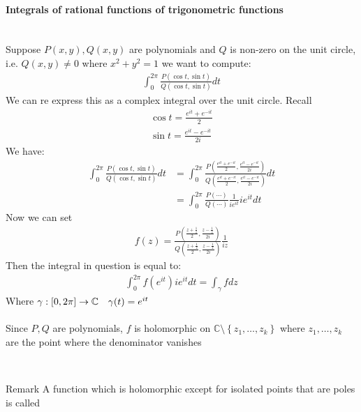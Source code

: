 \paragraph{Integrals of rational functions of trigonometric functions}%
	\label{par:Integrals of rational function of trigonometric functions}$ $\\

	
    
	Suppose $P\left(x, y\right), Q\left(x, y\right)$ are polynomials and $Q$ is non-zero on the unit circle, i.e. $Q\left(x, y\right) \neq 0$ where $x^2 + y^2 = 1$ we want to compute:
	\begin{align*} 
		\int_{0}^{2\pi}\frac{P\left(\cos t, \sin t\right)}{Q\left(\cos t, \sin t\right)}dt
	\end{align*}
	We can re express this as a complex integral over the unit circle. Recall
	\begin{align*} 
		\cos t =  \frac{e^{it} + e^{-it}}{2}\\
		\sin t =  \frac{e^{it} - e^{-it}}{2i}
	\end{align*}
	We have:
	\begin{align*} 
		\int_0^{2\pi}\frac{P\left(\cos t, \sin t\right)}{Q\left(\cos t, \sin t\right)}dt &= \int_0^{2\pi}\frac{P\left(\frac{e^{it} + e^{-it}}{2}, \frac{e^{it} - e^{-it}}{2i}\right)}{Q\left(\frac{e^{it} + e^{-it}}{2}, \frac{e^{it} - e^{-it}}{2i}\right)}dt\\
		&= \int_0^{2\pi} \frac{P\left(\cdots\right)}{Q\left(\cdots\right)}\frac{1}{ie^{it}}ie^{it}dt
	\end{align*}
	Now we can set 
	\begin{align*} 
		f\left(z\right) = \frac{P\left(\frac{z + \frac{1}{z}}{2}, \frac{z - \frac{1}{z}}{2i}\right)}{Q\left(\frac{z + \frac{1}{z}}{2}, \frac{z - \frac{1}{z}}{2i}\right)}\frac{1}{iz}
	\end{align*}
	Then the integral in question is equal to:
	\begin{align*} 
		\int_0^{2\pi} f\left(e^{it}\right)ie^{it}dt =  \int_{\gamma}fdz
	\end{align*}
	Where $\gamma : \left[0, 2\pi\right] \to \mathbb{C} \mathspace \gamma\left(t\right) =  e^{it}$ \\
	$ $\\
	Since $P, Q$ are polynomials, $f$ is holomorphic on $\mathbb{C} \setminus \left\{z_1, \ldots, z_k\right\}$ where $z_1, \ldots, z_k$ are the point where the denominator vanishes
	\begin{parag}{$ $}
	    
	
	\begin{subparag}{Remark}
	    A function which is holomorphic except for isolated points that are poles is called 
	\end{subparag}
	\end{parag}
